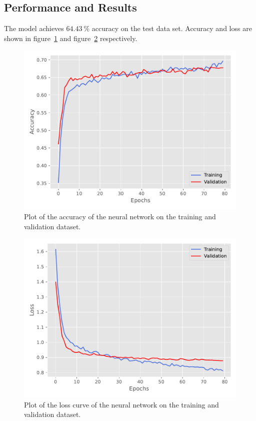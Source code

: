 \documentclass[
  12pt,
  bibliography=totoc,     %
  captions=tableheading,  %
  titlepage=firstiscover, %
]{scrartcl}
\begin{document}
\subsection{Performance and Results}
The model achieves $\SI{64.43}{\percent}$ accuracy on the test data set. Accuracy and loss are shown in figure~\ref{fig:nn_acc} and figure~\ref{fig:nn_loss} respectively.
\FloatBarrier
\begin{figure}[H]
  \centering
  \includegraphics[scale=0.7]{figures/NN/Acc.pdf}
  \caption{Plot of the accuracy of the neural network on the training and validation dataset.}
  \label{fig:nn_acc}
\end{figure}
\begin{figure}[ht]
  \centering
  \includegraphics[scale=0.7]{figures/NN/Loss.pdf}
  \caption{Plot of the loss curve of the neural network on the training and validation dataset.}
  \label{fig:nn_loss}
\end{figure}
\end{document}
